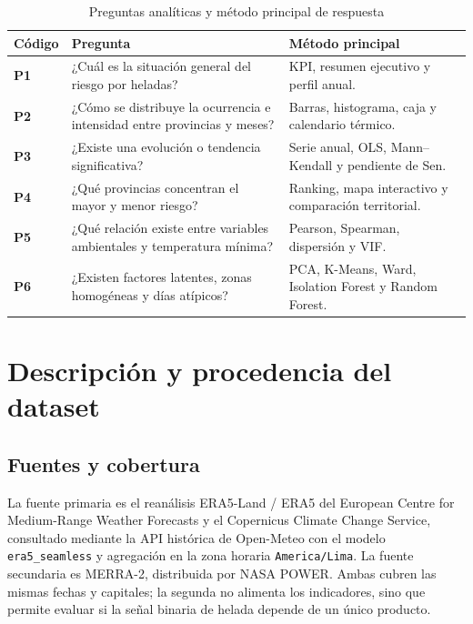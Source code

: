 \documentclass[11pt,a4paper]{article}
\begin{document}
\begin{table}[H]
\centering
\caption{Preguntas analíticas y método principal de respuesta}
\label{tab:preguntas}
\small
\begin{tabularx}{\textwidth}{>{\bfseries\centering\arraybackslash}p{1.3cm}X>{\raggedright\arraybackslash}p{4.7cm}}
\toprule
Código & Pregunta & Método principal \\
\midrule
P1 & ¿Cuál es la situación general del riesgo por heladas? & KPI, resumen ejecutivo y perfil anual. \\
P2 & ¿Cómo se distribuye la ocurrencia e intensidad entre provincias y meses? & Barras, histograma, caja y calendario térmico. \\
P3 & ¿Existe una evolución o tendencia significativa? & Serie anual, OLS, Mann--Kendall y pendiente de Sen. \\
P4 & ¿Qué provincias concentran el mayor y menor riesgo? & Ranking, mapa interactivo y comparación territorial. \\
P5 & ¿Qué relación existe entre variables ambientales y temperatura mínima? & Pearson, Spearman, dispersión y VIF. \\
P6 & ¿Existen factores latentes, zonas homogéneas y días atípicos? & PCA, K-Means, Ward, Isolation Forest y Random Forest. \\
\bottomrule
\end{tabularx}
\end{table}

\section{Descripción y procedencia del dataset}

\subsection{Fuentes y cobertura}

La fuente primaria es el reanálisis ERA5-Land / ERA5 del European Centre for
Medium-Range Weather Forecasts y el Copernicus Climate Change Service, consultado mediante
la API histórica de Open-Meteo con el modelo \texttt{era5\_seamless} y agregación en la zona
horaria \texttt{America/Lima}. La fuente secundaria es MERRA-2, distribuida por NASA POWER.
Ambas cubren las mismas fechas y capitales; la segunda no alimenta los indicadores, sino
que permite evaluar si la señal binaria de helada depende de un único producto.
\end{document}
